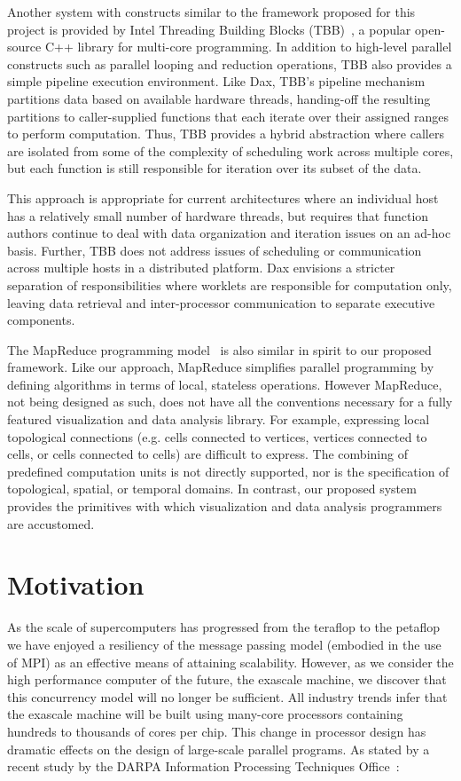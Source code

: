\documentclass{vgtc}                          %
\newcommand*{\lcite}[1]{~\cite{#1}}
\begin{document}
Another system with constructs similar to the framework proposed for this
project is provided by Intel Threading Building Blocks (TBB)\lcite{TBB}, a
popular open-source C++ library for multi-core programming.  In addition to
high-level parallel constructs such as parallel looping and reduction
operations, TBB also provides a simple pipeline execution environment.
Like Dax, TBB's pipeline mechanism
partitions data based on available hardware threads, handing-off the
resulting partitions to caller-supplied functions that each iterate over
their assigned ranges to perform computation.  Thus, TBB provides a hybrid
abstraction where callers are isolated from some of the complexity of
scheduling work across multiple cores, but each function is still
responsible for iteration over its subset of the data.

This approach is appropriate for current architectures where an individual
host has a relatively small number of hardware threads, but requires that
function authors continue to deal with data organization and iteration
issues on an ad-hoc basis.  Further, TBB does not address issues of
scheduling or communication across multiple hosts in a distributed
platform.  Dax envisions a stricter separation of
responsibilities where worklets are responsible for computation only,
leaving data retrieval and inter-processor communication to separate
executive components.

The MapReduce programming model\lcite{MapReduce} is also similar in spirit
to our proposed framework.  Like our approach, MapReduce simplifies
parallel programming by defining algorithms in terms of local, stateless
operations.  However MapReduce, not being designed as such, does not have
all the conventions necessary for a fully featured visualization and data
analysis library.  For example, expressing local topological connections
(e.g. cells connected to vertices, vertices connected to cells, or cells
connected to cells) are difficult to express.  The combining of predefined
computation units is not directly supported, nor is the specification of
topological, spatial, or temporal domains.  In contrast, our proposed
system provides the primitives with which visualization and data analysis
programmers are accustomed.

\section{Motivation}
\label{sec:Motivation}


As the scale of supercomputers has progressed from the teraflop to the
petaflop we have enjoyed a resiliency of the message passing model
(embodied in the use of MPI) as an effective means of attaining
scalability.  However, as we consider the high performance computer of the
future, the exascale machine, we discover that this concurrency model will
no longer be sufficient.  All industry trends infer that the exascale
machine will be built using many-core processors containing hundreds to
thousands of cores per chip.  This change in processor design has dramatic
effects on the design of large-scale parallel programs.  As stated by a
recent study by the DARPA Information Processing Techniques
Office\lcite{DARPAExascaleStudy}:
\end{document}

